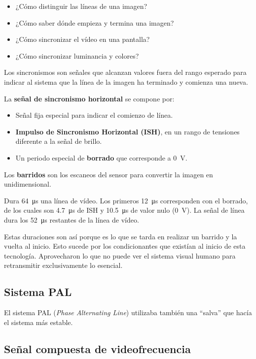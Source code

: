 \documentclass[10pt]{book}
\begin{document}
\begin{itemize}
  \item ¿Cómo distinguir las líneas de una imagen?
  \item ¿Cómo saber dónde empieza y termina una imagen?
  \item ¿Cómo sincronizar el vídeo en una pantalla?
  \item ¿Cómo sincronizar luminancia y colores?
\end{itemize}

Los sincronismos son señales que alcanzan valores fuera del rango esperado para indicar al sistema que la línea de la imagen ha terminado y comienza una nueva.

La \textbf{señal de sincronismo horizontal} se compone por:
\begin{itemize}
  \item Señal fija especial para indicar el comienzo de línea.
  \item \textbf{Impulso de Sincronismo Horizontal (ISH)}, en un rango de tensiones diferente a la señal de brillo.
  \item Un periodo especial de \textbf{borrado} que corresponde a \SI{0}{\volt}.
\end{itemize}


Los \textbf{barridos} son los escaneos del sensor para convertir la imagen en unidimensional.

Dura \SI{64}{\micro\second} una línea de vídeo. Los primeros \SI{12}{\micro\second} corresponden con el borrado, de los cuales son \SI{4.7}{\micro\second} de ISH y \SI{10.5}{\micro\second} de valor nulo (\SI{0}{\volt}). La señal de línea dura los \SI{52}{\micro\second} restantes de la línea de vídeo.

Estas duraciones son así porque es lo que se tarda en realizar un barrido y la vuelta al inicio. Esto sucede por los condicionantes que existían al inicio de esta tecnología. Aprovecharon lo que no puede ver el sistema visual humano para retransmitir exclusivamente lo esencial.

\subsection{Sistema PAL}

El sistema PAL (\textit{Phase Alternating Line}) utilizaba también una ``salva'' que hacía el sistema más estable.

\subsection{Señal compuesta de videofrecuencia}
\end{document}
